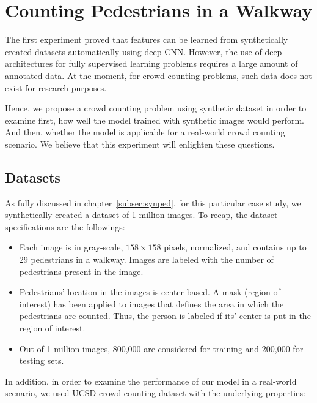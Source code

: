 \section{Counting Pedestrians in a Walkway}

The first experiment proved that features can be learned from synthetically created datasets automatically using deep CNN. However, the use of deep architectures for fully supervised learning problems requires a large amount of annotated data. At the moment, for crowd counting problems, such data does not exist for research purposes. 

Hence, we propose a crowd counting problem using synthetic dataset in order to examine first, how well the model trained with synthetic images would perform. And then, whether the model is applicable for a real-world crowd counting scenario. We believe that this experiment will enlighten these questions. 

\subsection{Datasets} 

As fully discussed in chapter~\ref{subsec:synped}, for this particular case study, we synthetically created a dataset of 1 million images. To recap, the dataset specifications are the followings:
\begin{itemize}
\item Each image is in gray-scale, $158\times158$ pixels, normalized, and contains up to 29 pedestrians in a walkway. Images are labeled with the number of pedestrians present in the image.  
\item Pedestrians' location in the images is center-based. A mask (region of interest) has been applied to images that defines the area in which the pedestrians are counted. Thus, the person is labeled if its' center is put in the region of interest.   
\item Out of 1 million images, 800,000 are considered for training and 200,000 for testing sets.
\end{itemize} 

\noindent In addition, in order to examine the performance of our model in a real-world scenario, we used UCSD crowd counting dataset \cite{chan2008privacy} with the underlying properties:

